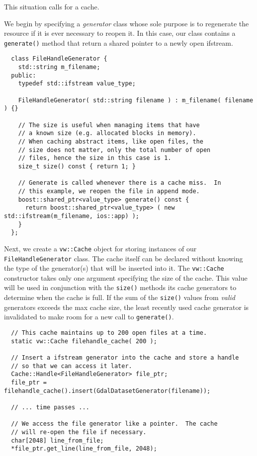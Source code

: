 This situation calls for a cache.

We begin by specifying a {\em generator} class whose sole purpose is
to regenerate the resource if it is ever necessary to reopen it.  In
this case, our class contains a \verb#generate()# method that return a
shared pointer to a newly open ifstream.

\begin{verbatim}
  class FileHandleGenerator {
    std::string m_filename;
  public:
    typedef std::ifstream value_type;

    FileHandleGenerator( std::string filename ) : m_filename( filename ) {}

    // The size is useful when managing items that have
    // a known size (e.g. allocated blocks in memory).
    // When caching abstract items, like open files, the
    // size does not matter, only the total number of open
    // files, hence the size in this case is 1.
    size_t size() const { return 1; }

    // Generate is called whenever there is a cache miss.  In
    // this example, we reopen the file in append mode.
    boost::shared_ptr<value_type> generate() const {
      return boost::shared_ptr<value_type> ( new std::ifstream(m_filename, ios::app) );
    }
  };
\end{verbatim}

Next, we create a \verb#vw::Cache# object for storing instances of our
\verb#FileHandleGenerator# class.  The cache itself can be declared
without knowing the type of the generator(s) that will be inserted
into it.  The \verb#vw::Cache# constructor takes only one argument
specifying the size of the cache.  This value will be used in
conjunction with the \verb#size()# methods its cache generators to
determine when the cache is full.  If the sum of the \verb#size()#
values from {\em valid} generators exceeds the max cache size, the
least recently used cache generator is invalidated to make room for a
new call to \verb#generate()#.

\begin{verbatim}
  // This cache maintains up to 200 open files at a time.
  static vw::Cache filehandle_cache( 200 );

  // Insert a ifstream generator into the cache and store a handle
  // so that we can access it later.
  Cache::Handle<FileHandleGenerator> file_ptr;
  file_ptr = filehandle_cache().insert(GdalDatasetGenerator(filename));

  // ... time passes ...

  // We access the file generator like a pointer.  The cache
  // will re-open the file if necessary.
  char[2048] line_from_file;
  *file_ptr.get_line(line_from_file, 2048);
\end{verbatim}

